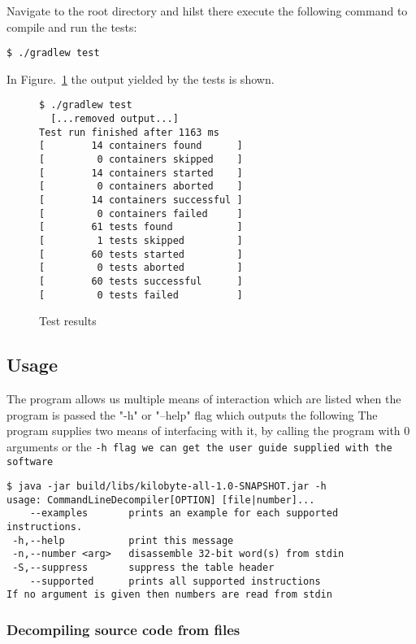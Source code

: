 Navigate to the root directory and hilst there execute the following
command to compile and run the tests:

\begin{lstlisting}[style=plain]
$ ./gradlew test
\end{lstlisting}

In Figure.~\ref{fig:tests} the output yielded by the tests is shown.

\begin{figure}[htpb]
\begin{lstlisting}[style=plain]
$ ./gradlew test             
  [...removed output...]
Test run finished after 1163 ms
[        14 containers found      ]
[         0 containers skipped    ]
[        14 containers started    ]
[         0 containers aborted    ]
[        14 containers successful ]
[         0 containers failed     ]
[        61 tests found           ]
[         1 tests skipped         ]
[        60 tests started         ]
[         0 tests aborted         ]
[        60 tests successful      ]
[         0 tests failed          ]
\end{lstlisting}
\caption{Test results}
\label{fig:tests}
\end{figure}

\subsection{Usage}

The program allows us multiple means of interaction which are listed
when the program is passed the "-h" or "--help" flag which outputs the following
The program supplies two means of interfacing with it, by calling
the program with 0 arguments or the \tt{-h} flag we can get the
user guide supplied with the software

\begin{lstlisting}[style=plain]
$ java -jar build/libs/kilobyte-all-1.0-SNAPSHOT.jar -h
usage: CommandLineDecompiler[OPTION] [file|number]...
    --examples       prints an example for each supported instructions.
 -h,--help           print this message
 -n,--number <arg>   disassemble 32-bit word(s) from stdin
 -S,--suppress       suppress the table header
    --supported      prints all supported instructions
If no argument is given then numbers are read from stdin
\end{lstlisting}

\subsubsection{Decompiling source code from files}

